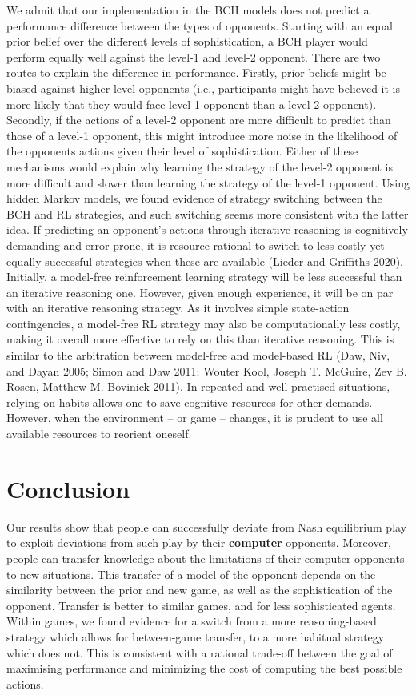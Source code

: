 \documentclass[smallextended]{svjour3}       %
\begin{document}
We admit that our implementation in the BCH models does not predict a
performance difference between the types of opponents. Starting with an
equal prior belief over the different levels of sophistication, a BCH
player would perform equally well against the level-1 and level-2
opponent. There are two routes to explain the difference in performance.
Firstly, prior beliefs might be biased against higher-level opponents
(i.e., participants might have believed it is more likely that they
would face level-1 opponent than a level-2 opponent). Secondly, if the
actions of a level-2 opponent are more difficult to predict than those
of a level-1 opponent, this might introduce more noise in the likelihood
of the opponents actions given their level of sophistication. Either of
these mechanisms would explain why learning the strategy of the level-2
opponent is more difficult and slower than learning the strategy of the
level-1 opponent. Using hidden Markov models, we found evidence of
strategy switching between the BCH and RL strategies, and such switching
seems more consistent with the latter idea. If predicting an opponent's
actions through iterative reasoning is cognitively demanding and
error-prone, it is resource-rational to switch to less costly yet
equally successful strategies when these are available (Lieder and
Griffiths 2020). Initially, a model-free reinforcement learning strategy
will be less successful than an iterative reasoning one. However, given
enough experience, it will be on par with an iterative reasoning
strategy. As it involves simple state-action contingencies, a model-free
RL strategy may also be computationally less costly, making it overall
more effective to rely on this than iterative reasoning. This is similar
to the arbitration between model-free and model-based RL (Daw, Niv, and
Dayan 2005; Simon and Daw 2011; Wouter Kool, Joseph T. McGuire, Zev B.
Rosen, Matthew M. Bovinick 2011). In repeated and well-practised
situations, relying on habits allows one to save cognitive resources for
other demands. However, when the environment -- or game -- changes, it
is prudent to use all available resources to reorient oneself.

\hypertarget{conclusion}{%
\section{Conclusion}\label{conclusion}}

Our results show that people can successfully deviate from Nash
equilibrium play to exploit deviations from such play by their
\textbf{computer} opponents. Moreover, people can transfer knowledge
about the limitations of their computer opponents to new situations.
This transfer of a model of the opponent depends on the similarity
between the prior and new game, as well as the sophistication of the
opponent. Transfer is better to similar games, and for less
sophisticated agents. Within games, we found evidence for a switch from
a more reasoning-based strategy which allows for between-game transfer,
to a more habitual strategy which does not. This is consistent with a
rational trade-off between the goal of maximising performance and
minimizing the cost of computing the best possible actions.
\end{document}
